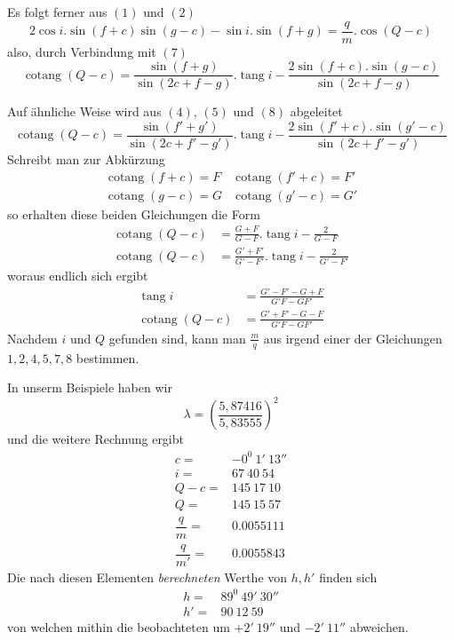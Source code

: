 Es folgt ferner aus $(1)$ und $(2)$
\[
2\cos i.\sin(f+c)\sin(g-c)-\sin i.\sin(f+g)=\frac{q}{m}.\cos(Q-c)
\]
also, durch Verbindung mit $(7)$
\[
\operatorname{cotang}(Q-c)=\frac{\sin(f+g)}{\sin(2c+f-g)}.\operatorname{tang}i-\frac{2\sin(f+c).\sin(g-c)}{\sin(2c+f-g)}
\]
\par\clearpage
{}
\noindent Auf ähnliche Weise wird aus $(4)$, $(5)$ und $(8)$ abgeleitet
\[
\operatorname{cotang}(Q-c)=\frac{\sin(f'+g')}{\sin(2c+f'-g')}.\operatorname{tang}i-\frac{2\sin(f'+c).\sin(g'-c)}{\sin(2c+f'-g')}
\]
Schreibt man zur Abkürzung
\[
\begin{array}{ll}
\operatorname{cotang}(f+c)=F&\operatorname{cotang}(f'+c)=F'\\
\operatorname{cotang}(g-c)=G&\operatorname{cotang}(g'-c)=G'
\end{array}
\]
so erhalten diese beiden Gleichungen die Form
\[
\begin{aligned}
\operatorname{cotang}(Q-c)&=\frac{G+F}{G-F}.\operatorname{tang}i-\frac{2}{G-F}\\
\operatorname{cotang}(Q-c)&=\frac{G'+F'}{G'-F'}.\operatorname{tang}i-\frac{2}{G'-F'}
\end{aligned}
\]
woraus endlich sich ergibt
\[
\begin{aligned}
\operatorname{tang}i&=\frac{G'-F'-G+F}{G'F-GF'}\\
\operatorname{cotang}(Q-c)&=\frac{G'+F'-G-F}{G'F-GF'}
\end{aligned}
\]
Nachdem $i$ und $Q$ gefunden sind, kann man $\frac{m}{q}$ aus irgend einer der Gleichungen $1,2,4,5,7,8$ bestimmen.

In unserm Beispiele haben wir
\[
\lambda=\left(\frac{5{,}87416}{5{,}83555}\right)^2
\]
und die weitere Rechnung ergibt
\[
\begin{array}{rl}
c=&-0^0\ 1'\ 13''\\
i=&67\ 40\ 54\\
Q-c=&145\ 17\ 10\\
Q=&145\ 15\ 57\\
\dfrac{q}{m}=&0.0055111\\[4pt]
\dfrac{q}{m'}=&0.0055843
\end{array}
\]
Die nach diesen Elementen \textit{berechneten} Werthe von $h,h'$ finden sich
\[
\begin{array}{rl}
h=&89^0\ 49'\ 30''\\
h'=&90\ 12\ 59
\end{array}
\]
von welchen mithin die beobachteten um $+2'\ 19''$ und $-2'\ 11''$ abweichen.

